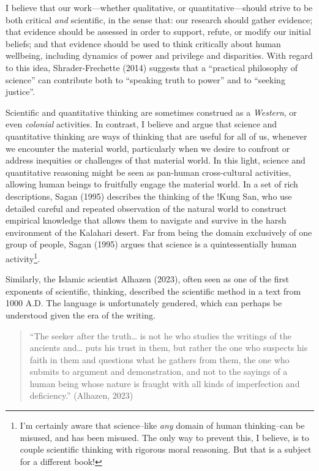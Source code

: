 \documentclass[
  letterpaper,
  DIV=11,
  numbers=noendperiod]{scrreprt}
\begin{document}
I believe that our work---whether qualitative, or quantitative---should
strive to be both critical \emph{and} scientific, in the sense that: our
research should gather evidence; that evidence should be assessed in
order to support, refute, or modify our initial beliefs; and that
evidence should be used to think critically about human wellbeing,
including dynamics of power and privilege and disparities. With regard
to this idea, Shrader-Frechette (2014) suggests that a ``practical
philosophy of science'' can contribute both to ``speaking truth to
power'' and to ``seeking justice''.

Scientific and quantitative thinking are sometimes construed as a
\emph{Western}, or even \emph{colonial} activities. In contrast, I
believe and argue that science and quantitative thinking are ways of
thinking that are useful for all of us, whenever we encounter the
material world, particularly when we desire to confront or address
inequities or challenges of that material world. In this light, science
and quantitative reasoning might be seen as pan-human cross-cultural
activities, allowing human beings to fruitfully engage the material
world. In a set of rich descriptions, Sagan (1995) describes the
thinking of the !Kung San, who use detailed careful and repeated
observation of the natural world to construct empirical knowledge that
allows them to navigate and survive in the harsh environment of the
Kalahari desert. Far from being the domain exclusively of one group of
people, Sagan (1995) argues that science is a quintessentially human
activity\footnote{I'm certainly aware that science--like \emph{any}
  domain of human thinking--can be misused, and has been misused. The
  only way to prevent this, I believe, is to couple scientific thinking
  with rigorous moral reasoning. But that is a subject for a different
  book!}.

Similarly, the Islamic scientist Alhazen (2023), often seen as one of
the first exponents of scientific, thinking, described the scientific
method in a text from 1000 A.D. The language is unfortunately gendered,
which can perhaps be understood given the era of the writing.

\begin{quote}
``The seeker after the truth\ldots{} is not he who studies the writings
of the ancients and\ldots{} puts his trust in them, but rather the one
who suspects his faith in them and questions what he gathers from them,
the one who submits to argument and demonstration, and not to the
sayings of a human being whose nature is fraught with all kinds of
imperfection and deficiency.'' (Alhazen, 2023)
\end{quote}
\end{document}
